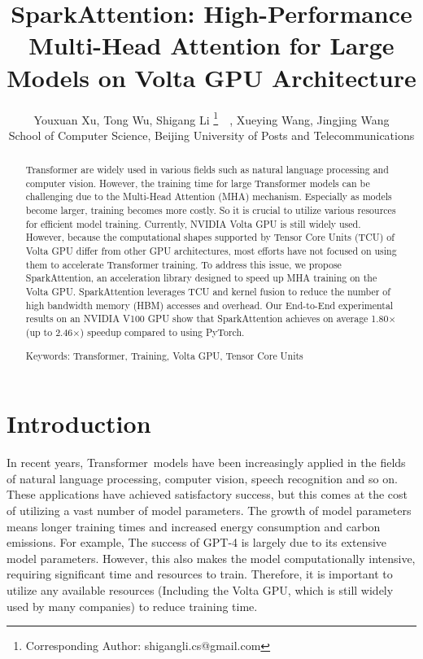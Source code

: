 \documentclass[10pt,twocolumn]{article}
\title{\LARGE\bfseries\sffamily SparkAttention: High-Performance Multi-Head Attention for Large Models on Volta GPU Architecture}
\author{Youxuan Xu, Tong Wu, Shigang Li \thanks{Corresponding Author: shigangli.cs@gmail.com}\ \ , Xueying Wang, Jingjing Wang\\ School of Computer Science, Beijing University of Posts and Telecommunications}
\date{}
\begin{document}
\maketitle

\singlespacing

\thispagestyle{empty}

\begin{abstract} \label{sec:abstract}
Transformer are widely used in various fields such as natural language processing and computer vision. 
However, the training time for large Transformer models can be challenging due to the Multi-Head Attention (MHA) mechanism. 
Especially as models become larger, training becomes more costly.
So it is crucial to utilize various resources for efficient model training. 
Currently, NVIDIA Volta GPU is still widely used. 
However, because the computational shapes supported by Tensor Core Units (TCU) of Volta GPU differ from other GPU architectures, most efforts have not focused on using them to accelerate Transformer training. 
To address this issue, we propose SparkAttention, an acceleration library designed to speed up MHA training on the Volta GPU. 
SparkAttention leverages TCU and kernel fusion to reduce the number of high bandwidth memory (HBM) accesses and overhead.
Our End-to-End experimental results on an NVIDIA V100 GPU show that SparkAttention achieves on average 1.80$\times$ (up to 2.46$\times$) speedup compared to using PyTorch.

Keywords: Transformer, Training, Volta GPU, Tensor Core Units
\end{abstract}



\section{Introduction} \label{sec:introduction}
In recent years, Transformer~\cite{vaswani2017attention}models have been increasingly applied in the fields of natural language processing\cite{wolf2020transformers,kalyan2021ammus,wolf2019huggingface}, computer vision\cite{wu2020visual,bi2021transformer,liu2021swin}, speech recognition\cite{dong2018speech,gulati2020conformer,zhang2020transformer} and so on. 
These applications have achieved satisfactory success, but this comes at the cost of utilizing a vast number of model parameters.
The growth of model parameters means longer training times and increased energy consumption and carbon emissions\cite{powerai,strubell2020energy,patterson2021carbon}. 
For example, The success of GPT-4\cite{openai2023gpt4} is largely due to its extensive model parameters. However, this also makes the model computationally intensive, requiring significant time and resources to train.
Therefore, it is important to utilize any available resources (Including the Volta\cite{volta} GPU, which is still widely used by many companies) to reduce training time.
\end{document}
